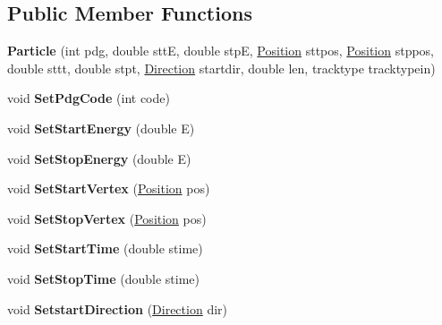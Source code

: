 \subsection*{Public Member Functions}
\begin{DoxyCompactItemize}
\item 
\hypertarget{classParticle_a10c8ee36554a8ad1d3f910537a88567a}{{\bfseries Particle} (int pdg, double stt\-E, double stp\-E, \hyperlink{classPosition}{Position} sttpos, \hyperlink{classPosition}{Position} stppos, double sttt, double stpt, \hyperlink{classDirection}{Direction} startdir, double len, tracktype tracktypein)}\label{classParticle_a10c8ee36554a8ad1d3f910537a88567a}

\item 
\hypertarget{classParticle_a1032e7cf325e073f2bbc7a0447c17780}{void {\bfseries Set\-Pdg\-Code} (int code)}\label{classParticle_a1032e7cf325e073f2bbc7a0447c17780}

\item 
\hypertarget{classParticle_a83b748ccb2402b630ebc2be12b697383}{void {\bfseries Set\-Start\-Energy} (double E)}\label{classParticle_a83b748ccb2402b630ebc2be12b697383}

\item 
\hypertarget{classParticle_a427b73c000394c699f92bee299208f84}{void {\bfseries Set\-Stop\-Energy} (double E)}\label{classParticle_a427b73c000394c699f92bee299208f84}

\item 
\hypertarget{classParticle_a44c601a3c061fd42a7be111ce47c1946}{void {\bfseries Set\-Start\-Vertex} (\hyperlink{classPosition}{Position} pos)}\label{classParticle_a44c601a3c061fd42a7be111ce47c1946}

\item 
\hypertarget{classParticle_a534cc15b476cd65617c02711b6082a5a}{void {\bfseries Set\-Stop\-Vertex} (\hyperlink{classPosition}{Position} pos)}\label{classParticle_a534cc15b476cd65617c02711b6082a5a}

\item 
\hypertarget{classParticle_a71be9f9aef04cb704ab99df9da267b04}{void {\bfseries Set\-Start\-Time} (double stime)}\label{classParticle_a71be9f9aef04cb704ab99df9da267b04}

\item 
\hypertarget{classParticle_a02576e01713e80369ff7c7aa7ead331d}{void {\bfseries Set\-Stop\-Time} (double stime)}\label{classParticle_a02576e01713e80369ff7c7aa7ead331d}

\item 
\hypertarget{classParticle_ae47d25ec4e0d67cada6f4ebcb7696255}{void {\bfseries Setstart\-Direction} (\hyperlink{classDirection}{Direction} dir)}\label{classParticle_ae47d25ec4e0d67cada6f4ebcb7696255}


\end{DoxyCompactItemize}
